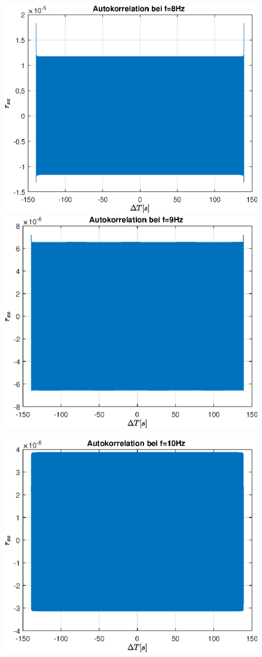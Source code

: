 \documentclass{article}
\begin{document}
\begin{figure}[!h]
\includegraphics[width=0.5\linewidth]{img/sim_rxx_sine_freq_8}
\includegraphics[width=0.5\linewidth]{img/sim_rxx_sine_freq_9}
\end{figure}
\begin{figure}[!h]
\centering
\includegraphics[width=0.5\linewidth]{img/sim_rxx_sine_freq_10}
\end{figure}

\newpage
\end{document}
